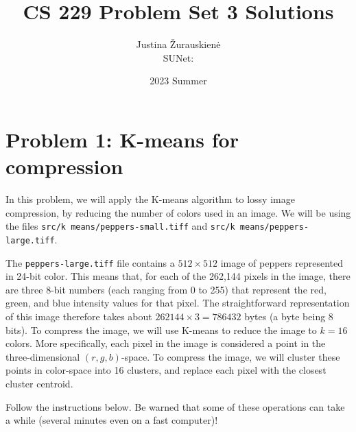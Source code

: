 \documentclass{article}
\title{CS 229 Problem Set 3 Solutions}
\author{Justina \v{Z}urauskien\.{e} \\ SUNet: }
\date{2023 Summer}
\begin{document}
\maketitle

\section*{Problem 1: K-means for compression}
In this problem, we will apply the K-means algorithm to lossy image compression, by reducing the number of colors used in an image. We will be using the files \texttt{src/k means/peppers-small.tiff} and \texttt{src/k means/peppers-large.tiff}.

The \texttt{peppers-large.tiff} file contains a $512 \times 512$ image of peppers represented in 24-bit color. This means that, for each of the 262,144 pixels in the image, there are three 8-bit numbers (each ranging from 0 to 255) that represent the red, green, and blue intensity values for that pixel. The straightforward representation of this image therefore takes about $262144 \times 3 = 786432$ bytes (a byte being 8 bits). To compress the image, we will use K-means to reduce the image to $k = 16$ colors. More specifically, each pixel in the image is considered a point in the three-dimensional $(r, g, b)$-space. To compress the image, we will cluster these points in color-space into 16 clusters, and replace each pixel with the closest cluster centroid.

Follow the instructions below. Be warned that some of these operations can take a while (several minutes even on a fast computer)!
\end{document}
